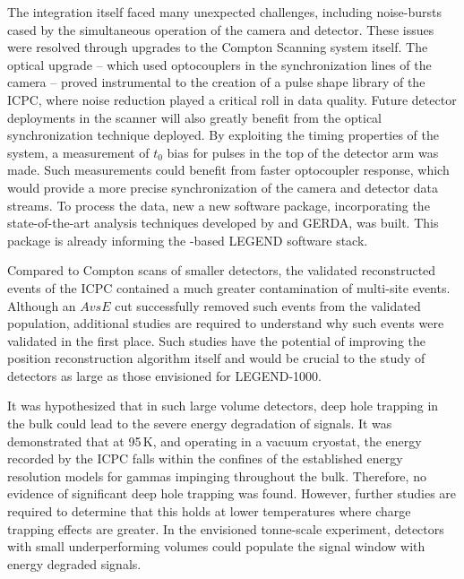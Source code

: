 The integration itself faced many unexpected challenges, including noise-bursts cased by the simultaneous operation of the camera and detector. These issues were resolved through upgrades to the Compton Scanning system itself. The optical upgrade -- which used optocouplers in the synchronization lines of the camera -- proved instrumental to the creation of a pulse shape library of the ICPC, where noise reduction played a critical roll in data quality. Future detector deployments in the scanner will also greatly benefit from the optical synchronization technique deployed. By exploiting the timing properties of the system, a measurement of $t_0$ bias for pulses in the top of the detector arm was made. Such measurements could benefit from faster optocoupler response, which would provide a more precise synchronization of the camera and detector data streams. To process the data, new a new software package, incorporating the state-of-the-art analysis techniques developed by {\MJMit} and GERDA, was built. This package is already informing the \julia{}-based LEGEND software stack.

Compared to Compton scans of smaller detectors, the validated reconstructed events of the ICPC contained a much greater contamination of multi-site events. Although an $AvsE$ cut successfully removed such events from the validated population, additional studies are required to understand why such events were validated in the first place. Such studies have the potential of improving the position reconstruction algorithm itself and would be crucial to the study of detectors as large as those envisioned for LEGEND-1000. 

It was hypothesized that in such large volume detectors, deep hole trapping in the bulk could lead to the severe energy degradation of signals. It was demonstrated that at 95\,K, and operating in a vacuum cryostat, the energy recorded by the ICPC falls within the confines of the established energy resolution models for gammas impinging throughout the bulk. Therefore, no evidence of significant deep hole trapping was found. However, further studies are required to determine that this holds at lower temperatures where charge trapping effects are greater. In the envisioned tonne-scale \geEn{} experiment, detectors with small underperforming volumes could populate the \novbb{} signal window with energy degraded signals. 


